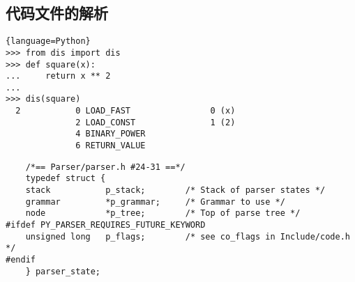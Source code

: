 \documentclass[UTF8]{book}
\begin{document}
\subsection{代码文件的解析}
\begin{lstlisting}{language=Python}
>>> from dis import dis
>>> def square(x):
...     return x ** 2
... 
>>> dis(square)
  2           0 LOAD_FAST                0 (x)
              2 LOAD_CONST               1 (2)
              4 BINARY_POWER
              6 RETURN_VALUE
\end{lstlisting}
\begin{lstlisting}
    /*== Parser/parser.h #24-31 ==*/
    typedef struct {
    stack           p_stack;        /* Stack of parser states */
    grammar         *p_grammar;     /* Grammar to use */
    node            *p_tree;        /* Top of parse tree */
#ifdef PY_PARSER_REQUIRES_FUTURE_KEYWORD
    unsigned long   p_flags;        /* see co_flags in Include/code.h */
#endif
    } parser_state;


\end{lstlisting}
\end{document}
